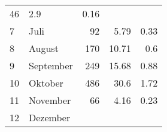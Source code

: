 \begin{longtable}{lXrrr}
       \num{46} &
       \num[round-mode=places,round-precision=2]{2,9} &
         \num[round-mode=places,round-precision=2]{0,16} \\

     7 &
     \multicolumn{1}{X}{ Juli   } &


       \num{92} &
       \num[round-mode=places,round-precision=2]{5,79} &
         \num[round-mode=places,round-precision=2]{0,33} \\

     8 &
     \multicolumn{1}{X}{ August   } &


       \num{170} &
       \num[round-mode=places,round-precision=2]{10,71} &
         \num[round-mode=places,round-precision=2]{0,6} \\

     9 &
     \multicolumn{1}{X}{ September   } &


       \num{249} &
       \num[round-mode=places,round-precision=2]{15,68} &
         \num[round-mode=places,round-precision=2]{0,88} \\

     10 &
     \multicolumn{1}{X}{ Oktober   } &


       \num{486} &
       \num[round-mode=places,round-precision=2]{30,6} &
         \num[round-mode=places,round-precision=2]{1,72} \\

     11 &
     \multicolumn{1}{X}{ November   } &


       \num{66} &
       \num[round-mode=places,round-precision=2]{4,16} &
         \num[round-mode=places,round-precision=2]{0,23} \\

     12 &
     \multicolumn{1}{X}{ Dezember   } &



\end{longtable}
